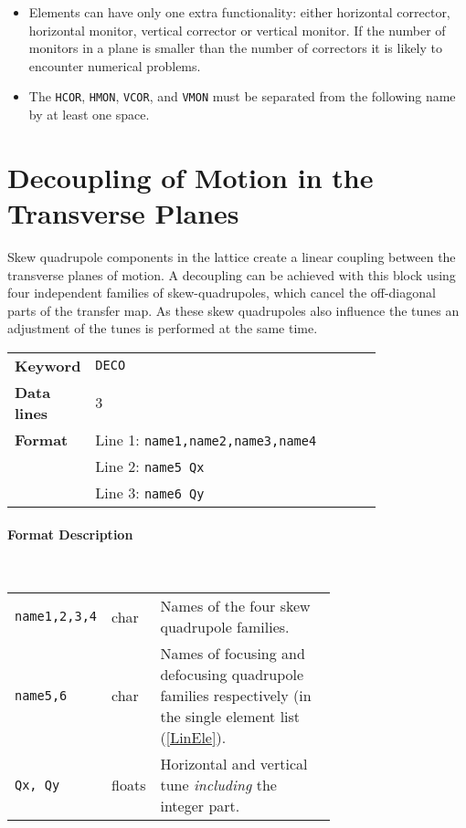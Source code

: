 \begin{itemize}
    \item Elements can have only one extra functionality: either horizontal corrector, horizontal monitor, vertical corrector or   vertical monitor. If the number of monitors in a plane is smaller than the number of correctors it is likely to encounter numerical problems.
    \item The \texttt{HCOR}, \texttt{HMON}, \texttt{VCOR}, and \texttt{VMON} must be separated from the following name by at least one space.
\end{itemize}

\section{Decoupling of Motion in the Transverse Planes} \label{LinDec}

Skew quadrupole components in the lattice create a linear coupling between the transverse planes of motion.
A decoupling can be achieved with this block using four independent families of skew-quadrupoles, which cancel the off-diagonal parts of the transfer map.
As these skew quadrupoles also influence the tunes an adjustment of the tunes is performed at the same time.

\bigskip
\begin{tabular}{@{}lp{0.8\linewidth}}
    \textbf{Keyword}    & \texttt{DECO}\index{DECO} \\
    \textbf{Data lines} & 3 \\
    \textbf{Format}     & Line 1: \texttt{name1,name2,name3,name4} \\
                        & Line 2: \texttt{name5 Qx} \\
                        & Line 3: \texttt{name6 Qy}
\end{tabular}

\paragraph{Format Description}~

\bigskip
\begin{tabular}{@{}llp{0.70\linewidth}}
    \texttt{name1,2,3,4} & char   & Names of the four skew quadrupole\index{skew quadrupole} families. \\
    \texttt{name5,6}     & char   & Names of focusing and defocusing quadrupole families respectively (in the single element list (\ref{LinEle}). \\
    \texttt{Qx, Qy}      & floats & Horizontal and vertical tune \emph{including} the integer part.
\end{tabular}

